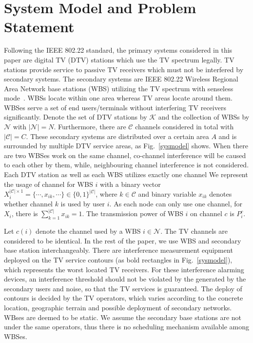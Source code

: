 \section{System Model and Problem Statement}
\label{SystemModel}
Following the IEEE 802.22 standard, the primary systems considered in this paper are digital TV (DTV) stations which use the TV spectrum legally. 
TV stations provide service to passive TV receivers which must not be interfered by secondary systems. 
The secondary systems are IEEE 802.22 Wireless Regional Area Network base stations (WBS) utilizing the TV spectrum with senseless mode~\cite{SenseLess2011}. 
WBSs locate within one area whereas TV areas locate around them. 
WBSes serve a set of end users/terminals without interfering TV receivers significantly.
Denote the set of DTV stations by $\mathcal{K}$ and the collection of WBSs by $\mathcal{N}$ with $| \mathcal{N}|=N$. 
Furthermore, there are $\mathcal{C}$ channels considered in total with $|\mathcal{C}| = C$. 
These secondary systems are distributed over a certain area $A$ and is surrounded by multiple DTV service areas, as Fig.~\ref{sysmodel} shows. 
When there are two WBSes work on the same channel, co-channel interference will be caused to each other by them, while, neighbouring channel interference is not considered. Each DTV station as well as each WBS utilizes exactly one channel 
We represent the usage of channel for WBS $i$ with a binary vector $X_i^{|\mathcal{C}|\times 1}=\{\cdots, x_{ik}, \cdots\}\in \{0,1\}^{|\mathcal{C}|}$, where $k\in \mathcal{C}$ and binary variable $x_{ik}$ denotes whether channel $k$ is used by user $i$. As each node can only use one channel, for $X_i$, there is $\sum_{k=1}^{|\mathcal{C}|}x_{ik}=1$. 
The transmission power of WBS $i$ on channel $c$ is $P_i^c$. 

Let $c(i)$ denote the channel used by a WBS $i\in \mathcal{N}$. 
The TV channels are considered to be identical. 
In the rest of the paper, we use WBS and secondary base station interchangeably. 
There are interference measurement equipment deployed on the TV service contours (as bold rectangles in Fig.~\ref{sysmodel}), which represents the worst located TV receivers. 
For these interference alarming devices, an interference threshold should not be violated by the generated by the secondary users and noise, so that the TV services is guaranteed.
The deploy of contours is decided by the TV operators, which varies according to the concrete location, geographic terrain and possible deployment of secondary networks. 
WBses are deemed to be static.
We assume the secondary base stations are not under the same operators, thus there is no scheduling mechanism available among WBSes.



